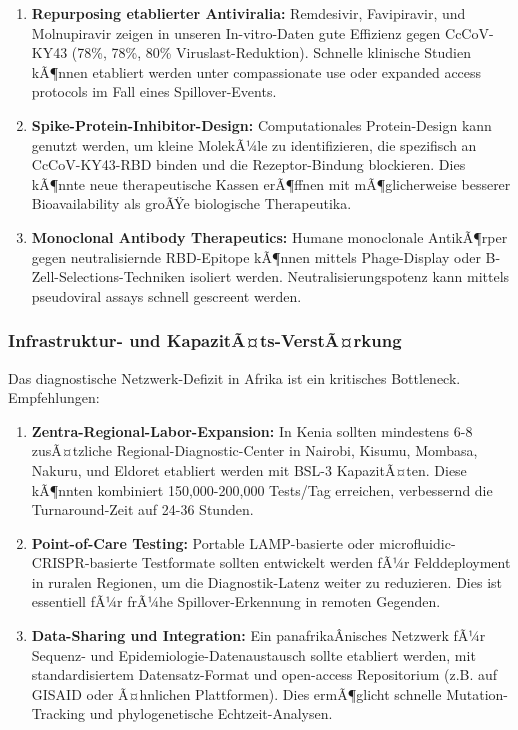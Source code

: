 ﻿\documentclass[11pt,a4paper]{article}
\theoremstyle{definition}
\begin{document}
\begin{enumerate}
\item \textbf{Repurposing etablierter Antiviralia:} Remdesivir, Favipiravir, und Molnupiravir zeigen in unseren In-vitro-Daten gute Effizienz gegen CcCoV-KY43 (78\%, 78\%, 80\% Viruslast-Reduktion). Schnelle klinische Studien kÃ¶nnen etabliert werden unter compassionate use oder expanded access protocols im Fall eines Spillover-Events.

\item \textbf{Spike-Protein-Inhibitor-Design:} Computationales Protein-Design kann genutzt werden, um kleine MolekÃ¼le zu identifizieren, die spezifisch an CcCoV-KY43-RBD binden und die Rezeptor-Bindung blockieren. Dies kÃ¶nnte neue therapeutische Kassen erÃ¶ffnen mit mÃ¶glicherweise besserer Bioavailability als groÃŸe biologische Therapeutika.

\item \textbf{Monoclonal Antibody Therapeutics:} Humane monoclonale AntikÃ¶rper gegen neutralisiernde RBD-Epitope kÃ¶nnen mittels Phage-Display oder B-Zell-Selections-Techniken isoliert werden. Neutralisierungspotenz kann mittels pseudoviral assays schnell gescreent werden.
\end{enumerate}

\subsubsection{Infrastruktur- und KapazitÃ¤ts-VerstÃ¤rkung}

Das diagnostische Netzwerk-Defizit in Afrika ist ein kritisches Bottleneck. Empfehlungen:

\begin{enumerate}
\item \textbf{Zentra-Regional-Labor-Expansion:} In Kenia sollten mindestens 6-8 zusÃ¤tzliche Regional-Diagnostic-Center in Nairobi, Kisumu, Mombasa, Nakuru, und Eldoret etabliert werden mit BSL-3 KapazitÃ¤ten. Diese kÃ¶nnten kombiniert 150,000-200,000 Tests/Tag erreichen, verbessernd die Turnaround-Zeit auf 24-36 Stunden.

\item \textbf{Point-of-Care Testing:} Portable LAMP-basierte oder microfluidic-CRISPR-basierte Testformate sollten entwickelt werden fÃ¼r Felddeployment in ruralen Regionen, um die Diagnostik-Latenz weiter zu reduzieren. Dies ist essentiell fÃ¼r frÃ¼he Spillover-Erkennung in remoten Gegenden.

\item \textbf{Data-Sharing und Integration:} Ein panafrikaÂ­nisches Netzwerk fÃ¼r Sequenz- und Epidemio\-logie-Datenaustausch sollte etabliert werden, mit standardisiertem Datensatz-Format und open-access Repositorium (z.B. auf GISAID oder Ã¤hnlichen Plattformen). Dies ermÃ¶glicht schnelle Mutation-Tracking und phylogenetische Echtzeit-Analysen.
\end{enumerate}
\end{document}
